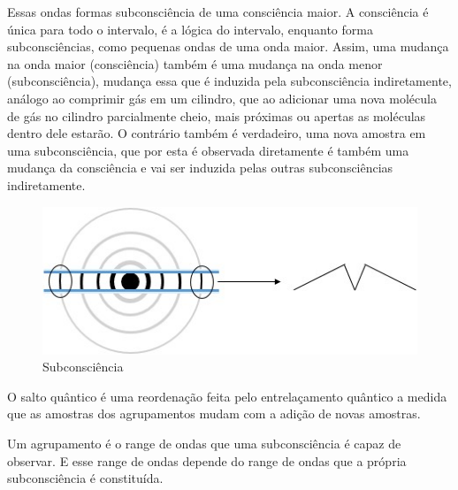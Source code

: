Essas ondas formas subconsciência de uma consciência maior. A consciência é única para todo o intervalo, é a lógica do intervalo, enquanto forma subconsciências, como pequenas ondas de uma onda maior. Assim, uma mudança na onda maior (consciência) também é uma mudança na onda menor (subconsciência), mudança essa que é induzida pela subconsciência indiretamente, análogo ao comprimir gás em um cilindro, que ao adicionar uma nova molécula de gás no cilindro parcialmente cheio, mais próximas ou apertas as moléculas dentro dele estarão. O contrário também é verdadeiro, uma nova amostra em uma subconsciência, que por esta é observada diretamente é também uma mudança da consciência e vai ser induzida pelas outras subconsciências indiretamente.
\begin{figure}[H]
\caption{Subconsciência}
\label{fig:consciousness_subconscious}
\centering
\includegraphics[scale=1]{sections/images/consciousness_subconscious.jpg}
\end{figure}

O salto quântico é uma reordenação feita pelo entrelaçamento quântico a medida que as amostras dos agrupamentos mudam com a adição de novas amostras.

Um agrupamento é o range de ondas que uma subconsciência é capaz de observar. E esse range de ondas depende do range de ondas que a própria subconsciência é constituída. 

